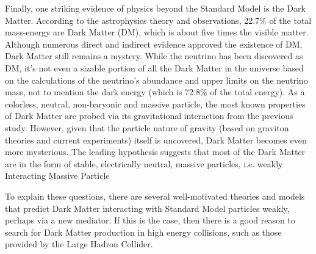 \par Finally, one striking evidence of physics beyond the Standard Model is the Dark Matter. According to the astrophysics theory and observations, 22.7\% of the total mass-energy are Dark Matter (DM), which is about five times the visible matter. Although numerous direct and indirect evidence approved the existence of DM, Dark Matter still remains a mystery. While the neutrino has been discovered as DM, it's not even a sizable portion of all the Dark Matter in the universe based on the calculations of the neutrino's abundance and upper limits on the neutrino mass, not to mention the dark energy (which is 72.8\% of the total energy). As a colorless, neutral, non-baryonic and massive particle, the most known properties of Dark Matter are probed via its gravitational interaction from the previous study. However, given that the particle nature of gravity (based on graviton theories and current experiments) itself is uncovered, Dark Matter becomes even more mysterious. The leading hypothesis suggests that most of the Dark Matter are in the form of stable, electrically neutral, massive particles, i.e. weakly Interacting Massive Particle

\par To explain these questions, there are several well-motivated theories and models that predict Dark Matter interacting with Standard Model particles weakly, perhaps via a new mediator. If this is the case, then there is a good reason to search for Dark Matter production in high energy collisions, such as those provided by the Large Hadron Collider.
